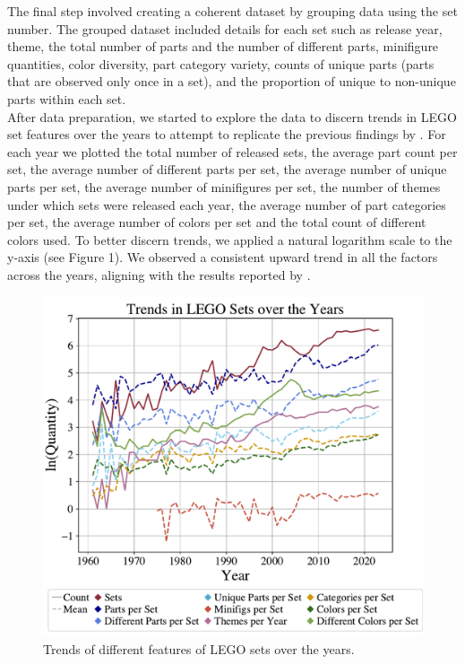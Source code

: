 \documentclass{article}
\theoremstyle{plain}
\theoremstyle{definition}
\theoremstyle{remark}
\begin{document}
The final step involved creating a coherent dataset by grouping data using the set number. The grouped dataset included details for each set such as release year, theme, the total number of parts and the number of different parts, minifigure quantities, color diversity, part category variety, counts of unique parts (parts that are observed only once in a set), and the proportion of unique to non-unique parts within each set.\\
After data preparation, we started to explore the data to discern trends in LEGO set features over the years to attempt to replicate the previous findings by \citet{legocomplexity}. For each year we plotted the total number of released sets, the average part count per set, the average number of different parts per set, the average number of unique parts per set, the average number of minifigures per set, the number of themes under which sets were released each year, the average number of part categories per set, the average number of colors per set and the total count of different colors used. To better discern trends, we applied a natural logarithm scale to the y-axis (see Figure 1). We observed a consistent upward trend in all the factors across the years, aligning with the results reported by \citet{legocomplexity}.\\
\begin{figure}[ht]
 \vskip 0.2in
 \begin{center}
 \centerline{\includegraphics[width=\columnwidth]{../Images/Exploration.pdf}}
\caption{Trends of different features of LEGO sets over the years.}
\label{icml-historical}
 \end{center}
 \vskip -0.2in
\end{figure}
\vfill\eject
\end{document}

